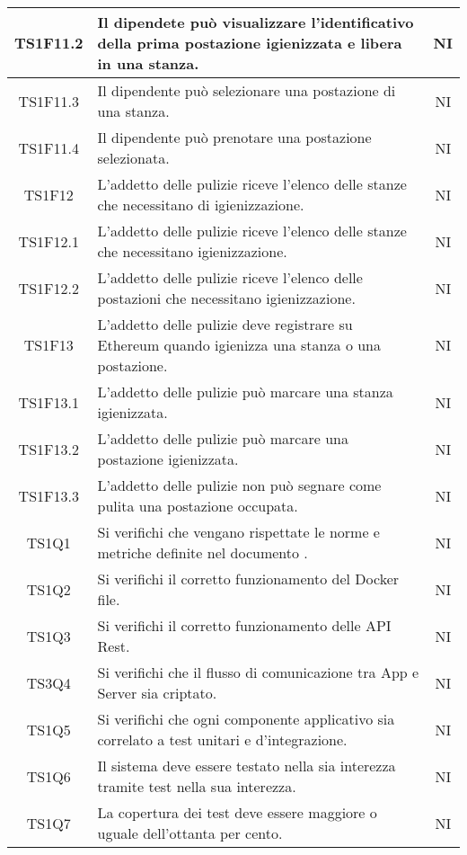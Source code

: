 \begin{center}
\begin{longtable}{|c|p{10cm}|c|}
			\hline
			TS1F11.2 & Il dipendete può visualizzare l'identificativo della prima postazione igienizzata e libera in una stanza. & NI \\	
			\hline
			TS1F11.3 & Il dipendente può selezionare una postazione di una stanza. & NI \\	
			\hline
			TS1F11.4 & Il dipendente può prenotare una postazione selezionata. & NI \\	
			\hline
			TS1F12 & L'addetto delle pulizie riceve l'elenco delle stanze che necessitano di igienizzazione. & NI \\	
			\hline
			TS1F12.1 & L'addetto delle pulizie riceve l'elenco delle stanze che necessitano igienizzazione. & NI \\	
			\hline
			TS1F12.2 & L'addetto delle pulizie riceve l'elenco delle postazioni che necessitano igienizzazione. & NI \\	
			\hline
			TS1F13 & L'addetto delle pulizie deve registrare su Ethereum quando igienizza una stanza o una postazione. & NI \\	
			\hline
			TS1F13.1 & L'addetto delle pulizie può marcare una stanza igienizzata. & NI \\	
			\hline
			TS1F13.2 & L'addetto delle pulizie può marcare una postazione igienizzata. & NI \\	
			\hline
			TS1F13.3 & L'addetto delle pulizie non può segnare come pulita una postazione occupata. & NI \\	
			\hline
			TS1Q1 & Si verifichi che vengano rispettate le norme e metriche definite nel documento \dext{Piano di Qualifica v. 1.0.0}. & NI \\	
			\hline			
			TS1Q2 & Si verifichi il corretto funzionamento del Docker file. & NI \\	
			\hline		
			TS1Q3 & Si verifichi il corretto funzionamento delle API Rest. & NI \\	
			\hline	
			TS3Q4 & Si verifichi che il flusso di comunicazione tra App e Server sia criptato. & NI \\	
			\hline
			TS1Q5 & Si verifichi che ogni componente applicativo sia correlato a test unitari e d'integrazione. & NI \\	
			\hline
			TS1Q6 & Il sistema deve essere testato nella sia interezza tramite test nella sua interezza. & NI \\	
			\hline
			TS1Q7 & La copertura dei test deve essere maggiore o uguale dell'ottanta per cento. & NI \\	

\end{longtable}
\end{center}
